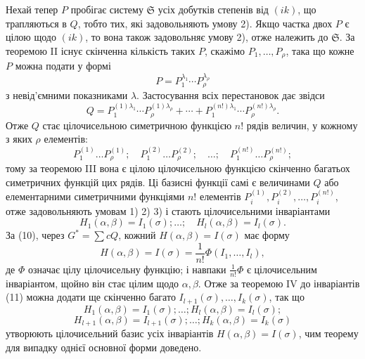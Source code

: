 \documentclass[11pt]{article}
\providecommand{\frS}{\mathfrak S}
\begin{document}
Нехай тепер \(P\) пробігає систему \(\frS\) усіх добутків степенів від \((ik)\), що трапляються в \(Q\), тобто тих, які задовольняють умову 2). Якщо частка двох \(P\) є цілою щодо \((ik)\), то вона також задовольняє умову 2), отже належить до \(\frS\). За теоремою II існує скінченна кількість таких \(P\), скажімо \(P_1,\ldots,P_\rho\), така що кожне \(P\) можна подати у формі
\[
        P=P_1^{\lambda_1}\cdots P_\rho^{\lambda_\rho}
\]
з невід'ємними показниками \(\lambda\). Застосування всіх перестановок дає звідси
\[
        Q=
        P_1^{(1)\lambda_1}\cdots P_\rho^{(1)\lambda_\rho}
        +\cdots+
        P_1^{(n!)\lambda_1}\cdots P_\rho^{(n!)\lambda_\rho}.
\]
Отже \(Q\) стає цілочисельною симетричною функцією \(n!\) рядів величин, у кожному з яких \(\rho\) елементів:
\[
        P_1^{(1)}\ldots P_\rho^{(1)};
        \quad
        P_1^{(2)}\ldots P_\rho^{(2)};
        \quad \ldots;\quad
        P_1^{(n!)}\ldots P_\rho^{(n!)};
\]
тому за теоремою III вона є цілою цілочисельною функцією скінченно багатьох симетричних функцій цих рядів. Ці базисні функції самі є величинами \(Q\) або елементарними симетричними функціями \(n!\) елементів \(P_i^{(1)},P_i^{(2)},\ldots,P_i^{(n!)}\), отже задовольняють умовам 1) 2) 3) і стають цілочисельними інваріантами
\begin{equation}
        H_1(\alpha,\beta)=I_1(\sigma);\ldots;\quad
        H_l(\alpha,\beta)=I_l(\sigma).
\end{equation}
За (10), через \(G^*=\sum cQ\), кожний \(H(\alpha,\beta)=I(\sigma)\) має форму
\[
        H(\alpha,\beta)=I(\sigma)=\frac1{n!}\Phi(I_1,\ldots,I_l),
\]
де \(\Phi\) означає цілу цілочисельну функцію; і навпаки \(\frac1{n!}\Phi\) є цілочисельним інваріантом, щойно він стає цілим щодо \(\alpha,\beta\). Отже за теоремою IV до інваріантів (11) можна додати ще скінченно багато \(I_{l+1}(\sigma),\ldots,I_k(\sigma)\), так що
\[
        H_1(\alpha,\beta)=I_1(\sigma);\ldots;H_l(\alpha,\beta)=I_l(\sigma);
\]
\[
        H_{l+1}(\alpha,\beta)=I_{l+1}(\sigma);\ldots;H_k(\alpha,\beta)=I_k(\sigma)
\]
утворюють цілочисельний базис усіх інваріантів \(H(\alpha,\beta)=I(\sigma)\), чим теорему для випадку однієї основної форми доведено.
\end{document}
